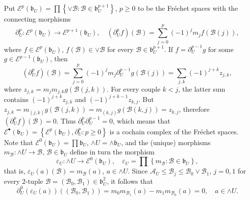 \documentclass[12pt]{amsart}%
\theoremstyle{plain}
\numberwithin{equation}{section}
\numberwithin{equation}{section}
\numberwithin{theorem}{section}
\numberwithin{lemma}{section}
\numberwithin{remark}{section}
\numberwithin{example}{section}
\numberwithin{proposition}{section}
\numberwithin{definition}{section}
\numberwithin{corollary}{section}
\begin{document}
Put $\mathcal{E}^{p}\left(  \mathfrak{b}_{U}\right)  =\prod\left\{
\vee\mathcal{B}:\mathcal{B}\in\mathfrak{b}_{U}^{p+1}\right\}  $, $p\geq0$ to
be the Fr\'{e}chet spaces with the connecting morphisms
\[
\partial_{U}^{p}:\mathcal{E}^{p}\left(  \mathfrak{b}_{U}\right)
\rightarrow\mathcal{E}^{p+1}\left(  \mathfrak{b}_{U}\right)  ,\quad\left(
\partial_{U}^{p}f\right)  \left(  \mathcal{B}\right)  =\sum_{j=0}^{p}\left(
-1\right)  ^{j}m_{j}f\left(  \mathcal{B}\left(  j\right)  \right)  ,
\]
where $f\in\mathcal{E}^{p}\left(  \mathfrak{b}_{U}\right)  $, $f\left(
\mathcal{B}\right)  \in\vee\mathcal{B}$ for every $\mathcal{B}\in
\mathfrak{b}_{U}^{p+1}$. If $f=\partial_{U}^{p-1}g$ for some $g\in
\mathcal{E}^{p-1}\left(  \mathfrak{b}_{U}\right)  $, then
\[
\left(  \partial_{U}^{p}f\right)  \left(  \mathcal{B}\right)  =\sum_{j=0}%
^{p}\left(  -1\right)  ^{j}m_{j}\partial_{U}^{p-1}g\left(  \mathcal{B}\left(
j\right)  \right)  =\sum_{j,k}\left(  -1\right)  ^{j+k}z_{j,k},
\]
where $z_{j,k}=m_{j}m_{j,k}g\left(  \mathcal{B}\left(  j,k\right)  \right)  $.
For every couple $k<j$, the latter sum contains $\left(  -1\right)
^{j+k}z_{j,k}$ and $\left(  -1\right)  ^{j+k-1}z_{k,j}$. But $z_{j,k}%
=m_{\left(  j,k\right)  }g\left(  \mathcal{B}\left(  j,k\right)  \right)
=m_{\left(  k,j\right)  }g\left(  \mathcal{B}\left(  k,j\right)  \right)
=z_{k,j}$, therefore $\left(  \partial_{U}^{p}f\right)  \left(  \mathcal{B}%
\right)  =0$. Thus $\partial_{U}^{p}\partial_{U}^{p-1}=0$, which means that
$\mathcal{E}^{\bullet}\left(  \mathfrak{b}_{U}\right)  =\left\{
\mathcal{E}^{p}\left(  \mathfrak{b}_{U}\right)  ,\partial_{U}^{p}%
:p\geq0\right\}  $ is a cochain complex of the Fr\'{e}chet spaces. Note that
$\mathcal{E}^{0}\left(  \mathfrak{b}_{U}\right)  =\prod\mathfrak{b}_{U}$,
$\wedge U=\wedge\mathfrak{b}_{U}$, and the (unique) morphisms $m_{\mathcal{B}%
}:\wedge U\rightarrow\mathcal{B}$, $\mathcal{B}\in\mathfrak{b}_{U}$ define in
turn the morphism
\[
\varepsilon_{U}:\wedge U\rightarrow\mathcal{E}^{0}\left(  \mathfrak{b}%
_{U}\right)  ,\quad\varepsilon_{U}=\prod\left\{  m_{\mathcal{B}}%
:\mathcal{B}\in\mathfrak{b}_{U}\right\}  ,
\]
that is, $\varepsilon_{U}\left(  a\right)  \left(  \mathcal{B}\right)
=m_{\mathcal{B}}\left(  a\right)  $, $a\in\wedge U$. Since $\mathcal{A}%
_{U}\leq\mathcal{B}_{j}\leq\mathcal{B}_{0}\vee\mathcal{B}_{1}$, $j=0,1$ for
every $2$-tuple $\mathcal{B=}\left(  \mathcal{B}_{0},\mathcal{B}_{1}\right)
\in\mathfrak{b}_{U}^{2}$, it follows that
\[
\partial_{U}^{0}\left(  \varepsilon_{U}\left(  a\right)  \right)  \left(
\left(  \mathcal{B}_{0},\mathcal{B}_{1}\right)  \right)  =m_{0}m_{\mathcal{B}%
_{1}}\left(  a\right)  -m_{1}m_{\mathcal{B}_{0}}\left(  a\right)  =0,\quad
a\in\wedge U.
\]
\end{document}
